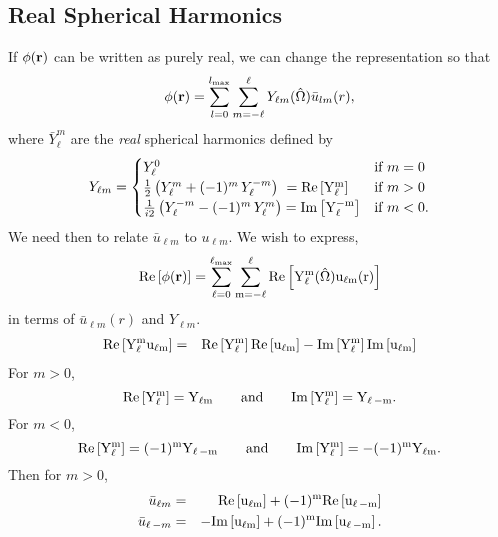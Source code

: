 \subsection{Real Spherical Harmonics}
\renewcommand{\Re}{\rm Re}
\renewcommand{\Im}{\rm Im}
If $\phi(\mathbf{r})$ can be written as purely real, we can change the
representation so that
\begin{equation}
\phi(\mathbf{r}) = \sum_{l=0}^{l_\text{max}} \sum_{m=-\ell}^\ell Y_{\ell m}(\hat{\Omega})
\bar{u}_{lm}(r),
\end{equation}
where $\bar{Y}_\ell^m$ are the {\em real} spherical harmonics defined by
\begin{equation}
Y_{\ell m} = \begin{cases}
Y_\ell^0 & \mbox{if } m=0\\
{1\over 2}\left(Y_\ell^m+(-1)^m \, Y_\ell^{-m}\right) \ = \Re\left[Y_\ell^m\right]
& \mbox{if } m>0 \\
{1\over i 2}\left(Y_\ell^{-m}-(-1)^{m}\, Y_\ell^{m}\right) = \Im\left[Y_\ell^{-m}\right]
&\mbox{if } m<0.
\end{cases}
\end{equation}
We need then to relate $\bar{u}_{\ell m}$ to $u_{\ell m}$.  We wish
to express,
\begin{equation}
\Re\left[\phi(\vr)\right] = \sum_{\ell=0}^{\ell_\text{max}} \sum_{m=-\ell}^\ell
\Re\left[Y_\ell^m (\hat{\Omega}) u_{\ell m}(r)\right]
\end{equation}
in terms of $\bar{u}_{\ell m}(r)$ and $Y_{\ell m}$.
\begin{eqnarray}
\Re\left[Y_\ell^m u_{\ell m}\right] & = & \Re\left[Y_\ell^m\right]
\Re\left[u_{\ell m}\right] - \Im\left[Y_\ell^m\right] \Im\left[u_{\ell m}\right]
\end{eqnarray}
For $m>0$,
\begin{equation}
\Re\left[Y_\ell^m\right] = Y_{\ell m} \qquad \text{and} \qquad \Im\left[Y_\ell^m\right] = Y_{\ell\,-m}.
\end{equation}
For $m<0$,
\begin{equation}
\Re\left[Y_\ell^m\right] = (-1)^m Y_{\ell\, -m} \qquad \text and \qquad \Im\left[Y_\ell^m\right] = -(-1)^m Y_{\ell m}.
\end{equation}
Then for $m > 0$,
\begin{eqnarray}
\bar{u}_{\ell m} & = & \Re\left[u_{\ell m}\right] + (-1)^m \Re\left[u_{\ell\,-m}\right] \\
\bar{u}_{\ell\, -m} & = & -\Im\left[u_{\ell m}\right] + (-1)^m \Im\left[u_{\ell\,-m}\right].
\end{eqnarray}


